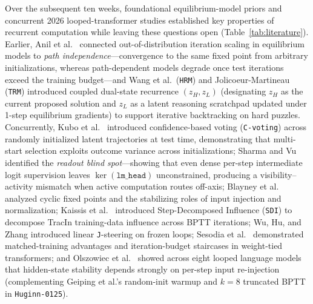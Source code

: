 \documentclass[10pt,letterpaper]{article}
\begin{document}
Over the subsequent ten weeks, foundational equilibrium-model priors and concurrent 2026 looped-transformer studies established key properties of recurrent computation while leaving these questions open (Table~\ref{tab:literature}). Earlier, Anil et al.\ \cite{anil2022path} connected out-of-distribution iteration scaling in equilibrium models to \emph{path independence}—convergence to the same fixed point from arbitrary initializations, whereas path-dependent models degrade once test iterations exceed the training budget—and Wang et al.\ (\texttt{HRM}) \cite{wang2025hrm} and Jolicoeur-Martineau (\texttt{TRM}) \cite{jolicoeur2025trm} introduced coupled dual-state recurrence $(z_H, z_L)$ (designating $z_H$ as the current proposed solution and $z_L$ as a latent reasoning scratchpad updated under 1-step equilibrium gradients) to support iterative backtracking on hard puzzles. Concurrently, Kubo et al.\ \cite{kubo2026cvoting} introduced confidence-based voting (\texttt{C-voting}) across randomly initialized latent trajectories at test time, demonstrating that multi-start selection exploits outcome variance across initializations; Sharma and Vu \cite{sharma2026dense} identified the \emph{readout blind spot}—showing that even dense per-step intermediate logit supervision leaves $\ker(\texttt{lm\_head})$ unconstrained, producing a visibility--activity mismatch when active computation routes off-axis; Blayney et al.\ \cite{blayney2026mechanistic} analyzed cyclic fixed points and the stabilizing roles of input injection and normalization; Kaissis et al.\ \cite{kaissis2026sdi} introduced Step-Decomposed Influence (\texttt{SDI}) to decompose TracIn training-data influence across BPTT iterations; Wu, Hu, and Zhang \cite{wu2026shared} introduced linear \texttt{J}-steering on frozen loops; Sesodia et al.\ \cite{sesodia2026inside} demonstrated matched-training advantages and iteration-budget staircases in weight-tied transformers; and Olszowiec et al.\ \cite{olszowiec2026monitoring} showed across eight looped language models that hidden-state stability depends strongly on per-step input re-injection (complementing Geiping et al.'s \cite{geiping2025huginn} random-init warmup and $k=8$ truncated BPTT in \texttt{Huginn-0125}).
\end{document}
